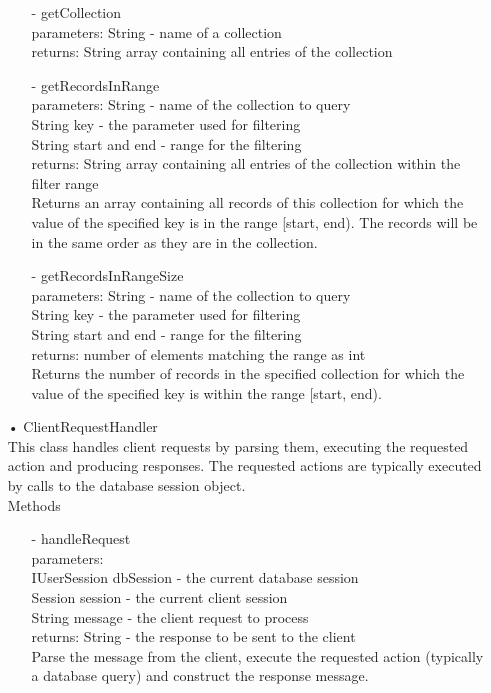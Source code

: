 \documentclass[oneside, english, final]{design}
\begin{document}
\begin{itemize}
\begin{itemize}
		      \item[-]getCollection
		            \\parameters: String - name of a collection
		            \\returns: String array containing all entries of the collection

		      \item[-]getRecordsInRange
		            \\parameters: String - name of the collection to query
		            \\String key - the parameter used for filtering
		            \\String start and end - range for the filtering
		            \\returns: String array containing all entries of the collection within the filter range
			    \\ Returns an array containing all records of this
				collection for which the value of the
				specified key is in the range [start, end).
				The records will be in the same order as
				they are in the collection.

		      \item[-]getRecordsInRangeSize
		            \\parameters: String - name of the collection to query
		            \\String key - the parameter used for filtering
		            \\String start and end - range for the filtering
		            \\returns: number of elements matching the range as int
		            \\Returns the number of records in the specified
				collection for which the value of the specified
				key is within the range [start, end).

	      \end{itemize}

\newpage

	\item[•]ClientRequestHandler
		\\This class handles client requests by parsing them, executing
		the requested action and producing responses.
		The requested actions are typically executed by calls to the database session object.
		\\Methods
	      \begin{itemize}
		      \item[-]handleRequest
		            \\parameters: \\IUserSession  dbSession - the current database session
		            \\Session session - the current client session
		            \\String message - the client request to process
		            \\returns: String - the response to be sent to the client
		            \\Parse the message from the client, execute the requested action (typically a database query)  and construct the response message.
	      \end{itemize}



\end{itemize}
\end{document}
